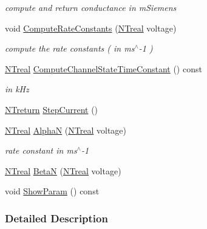 \begin{DoxyCompactItemize}
\begin{DoxyCompactList}\small\item\em compute and return conductance in mSiemens \item\end{DoxyCompactList}\item 
void \hyperlink{class_n_t_b_p__multi__potassium__current__o_aae36eb3690c08120afe0e5121faafdaf}{ComputeRateConstants} (\hyperlink{nt__types_8h_a814a97893e9deb1eedcc7604529ba80d}{NTreal} voltage)
\begin{DoxyCompactList}\small\item\em compute the rate constants ( in ms$^\wedge$-\/1 ) \item\end{DoxyCompactList}\item 
\hyperlink{nt__types_8h_a814a97893e9deb1eedcc7604529ba80d}{NTreal} \hyperlink{class_n_t_b_p__multi__potassium__current__o_ad06edc2140798e4b67dcf07210bb4cd3}{ComputeChannelStateTimeConstant} () const 
\begin{DoxyCompactList}\small\item\em in kHz \item\end{DoxyCompactList}\item 
\hyperlink{nt__types_8h_ab9564ee8f091e809d21b8451c6683c53}{NTreturn} \hyperlink{class_n_t_b_p__multi__potassium__current__o_a9c6a84403518b0bff4d857300a2147ac}{StepCurrent} ()
\item 
\hyperlink{nt__types_8h_a814a97893e9deb1eedcc7604529ba80d}{NTreal} \hyperlink{class_n_t_b_p__multi__potassium__current__o_ad10c777be8746d576d352e905f302785}{AlphaN} (\hyperlink{nt__types_8h_a814a97893e9deb1eedcc7604529ba80d}{NTreal} voltage)
\begin{DoxyCompactList}\small\item\em rate constant in ms$^\wedge$-\/1 \item\end{DoxyCompactList}\item 
\hyperlink{nt__types_8h_a814a97893e9deb1eedcc7604529ba80d}{NTreal} \hyperlink{class_n_t_b_p__multi__potassium__current__o_a8f6c6506928be03a432439f52ee248ec}{BetaN} (\hyperlink{nt__types_8h_a814a97893e9deb1eedcc7604529ba80d}{NTreal} voltage)
\item 
void \hyperlink{class_n_t_b_p__multi__potassium__current__o_a6cef7cba690c6c5e61ab3802f2a8990f}{ShowParam} () const 
\end{DoxyCompactItemize}


\subsubsection{Detailed Description}



